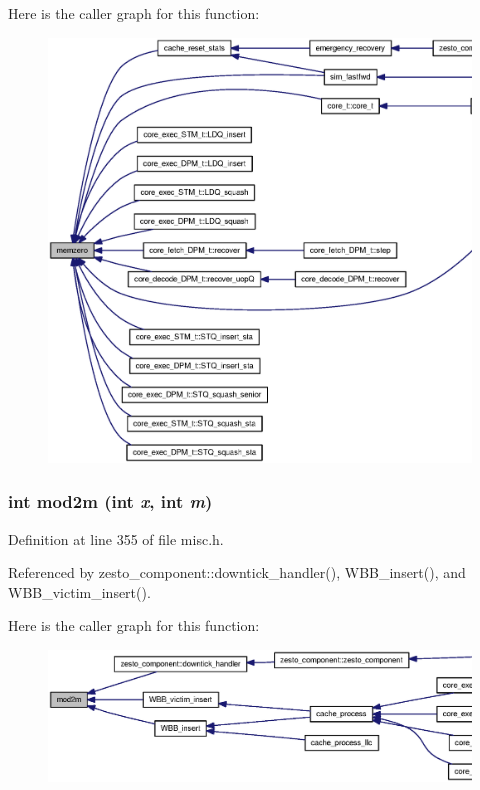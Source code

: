 Here is the caller graph for this function:\nopagebreak
\begin{figure}[H]
\begin{center}
\leavevmode
\includegraphics[width=420pt]{misc_8h_c0247ae9677929c0d7a34cd197d3e57e_icgraph}
\end{center}
\end{figure}
\subsubsection[{mod2m}]{\setlength{\rightskip}{0pt plus 5cm}int mod2m (int {\em x}, \/  int {\em m})\hspace{0.3cm}{\tt  [inline]}}\label{misc_8h_4c5ce3cf6c3a73be0ec80b5cb93c7159}




Definition at line 355 of file misc.h.

Referenced by zesto\_\-component::downtick\_\-handler(), WBB\_\-insert(), and WBB\_\-victim\_\-insert().

Here is the caller graph for this function:\nopagebreak
\begin{figure}[H]
\begin{center}
\leavevmode
\includegraphics[width=353pt]{misc_8h_4c5ce3cf6c3a73be0ec80b5cb93c7159_icgraph}
\end{center}
\end{figure}

